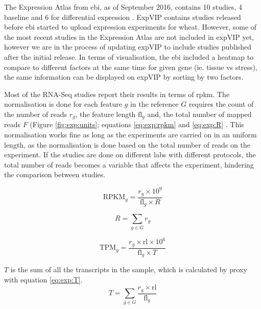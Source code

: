 The Expression Atlas from \acrshort{ebi}, as of September 2016, contains 10 studies, 4 baseline and 6 for differential expression \citep{Petryszak2016}. 
ExpVIP contains studies released before \acrshort{ebi} started to upload expression experiments for wheat. 
However, some of the most recent studies in the Expression Atlas are not included in expVIP yet, however we are in the process of updating expVIP to include studies published after the initial release.
In terms of visualisation, the \acrshort{ebi} included a heatmap to compare to different factors at the same time for given gene (ie. tissue vs stress), the same information can be displayed on expVIP by sorting by two factors.


Most of the RNA-Seq studies report their results in terms of \acrshort{rpkm}. 
The normalisation is done for each feature $g$ in the reference $G$ requires the count of the number of reads  $r_{g}$, the feature length $\textrm{fl}_{g}$ and, the total number of mapped reads $F$ (Figure \ref{fig:exp:units}; equations \ref{eq:exp:rpkm} and  \ref{eq:exp:R} \citep{Mortazavi2008}.
This normalisation works fine as long as the experiments are carried on in an uniform length, as the normalisation is done based on the total number of reads on the experiment.
If the studies are done on different labs with different protocols, the total number of reads becomes a variable that affects the experiment, hindering the comparison between studies. 

\begin{equation}
\label{eq:exp:rpkm}
  \textrm{RPKM}_{g} = \frac{r_{g}\times10^9}{\textrm{fl}_{g}\times R}
\end{equation}

\begin{equation}
\label{eq:exp:R}
R = \displaystyle\sum_{g \in G} r_{g} 
\end{equation}

\begin{equation}
  \textrm{TPM}_{g} = \frac{r_{g} \times \textrm{rl}\times10^6}{\textrm{fl}_{g} \times T }
\end{equation}

$T$ is the sum of all the transcripts in the sample, which is calculated by proxy with equation \ref{eq:exp:T}. 
\begin{equation}
\label{eq:exp:T}
T = \displaystyle\sum_{g \in G} \frac{r_{g} \times \textrm{rl}}{\textrm{fl}_{g}}
\end{equation}

